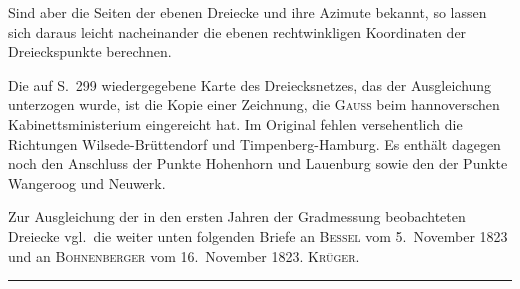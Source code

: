 \par\noindent\hspace*{\parindent}Sind aber die Seiten der ebenen Dreiecke und ihre Azimute bekannt, so
lassen sich daraus leicht nacheinander die ebenen rechtwinkligen
Koordinaten der Dreieckspunkte berechnen.

\par\noindent\hspace*{\parindent}Die auf S.~299 wiedergegebene Karte des Dreiecksnetzes, das der
Ausgleichung unterzogen wurde, ist die Kopie einer Zeichnung, die
\textsc{Gauss} beim hannoverschen Kabinettsministerium
eingereicht hat. Im Original fehlen versehentlich die Richtungen
Wilsede-Brüttendorf und Timpenberg-Hamburg. Es enthält dagegen noch
den Anschluss der Punkte Hohenhorn und Lauenburg sowie den der Punkte
Wangeroog und Neuwerk.

\par\noindent\hspace*{\parindent}Zur Ausgleichung der in den ersten Jahren der Gradmessung beobachteten
Dreiecke vgl.~die weiter unten folgenden Briefe an \textsc{Bessel} vom
5.~November 1823 und an \textsc{Bohnenberger} vom 16.~November 1823.
\hfill\textsc{Krüger.}

\begin{center}\rule{.24\textwidth}{.4pt}\end{center}
